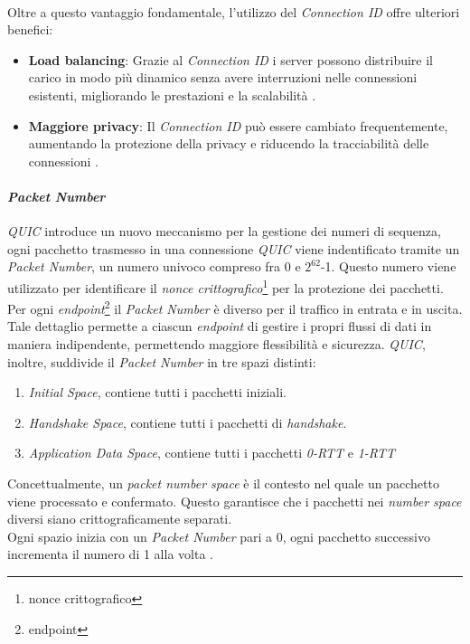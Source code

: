 \\
Oltre a questo vantaggio fondamentale, l'utilizzo del \emph{Connection ID} offre ulteriori benefici:
\begin{itemize}
\item \textbf{Load balancing}: Grazie al \emph{Connection ID} i server possono distribuire il carico in modo più dinamico senza avere interruzioni nelle connessioni esistenti, migliorando le prestazioni e la scalabilità \cite{site:quic-lb}.
\item \textbf{Maggiore privacy}: Il \emph{Connection ID} può essere cambiato frequentemente, aumentando la protezione della privacy e riducendo la tracciabilità delle connessioni \cite{site:quic-security}.
\end{itemize}
\paragraph{\textit{Packet Number}}

\noindent \emph{QUIC} introduce un nuovo meccanismo per la gestione dei numeri di sequenza, ogni pacchetto trasmesso in una connessione \emph{QUIC} viene indentificato tramite un \emph{Packet Number}, un numero univoco 
compreso fra 0 e $2^{62}$-1. Questo numero viene utilizzato per identificare il \emph{nonce crittografico}\footnote{\gls{nonce crittografico}} per la protezione dei pacchetti. 
Per ogni \emph{endpoint}\footnote{\gls{endpoint}} il \emph{Packet Number} è diverso per il traffico in entrata e in uscita. 
Tale dettaglio permette a ciascun \emph{endpoint} di gestire i propri flussi di dati in maniera indipendente, permettendo maggiore flessibilità e sicurezza.
\emph{QUIC}, inoltre, suddivide il \emph{Packet Number} in tre spazi distinti:
\begin{enumerate}[label=\roman*]
    \item \emph{Initial Space}, contiene tutti i pacchetti iniziali.
    \item \emph{Handshake Space}, contiene tutti i pacchetti di \emph{handshake}.
    \item \emph{Application Data Space}, contiene tutti i pacchetti \emph{0-RTT} e \emph{1-RTT}
\end{enumerate}
\noindent Concettualmente, un \emph{packet number space} è il contesto nel quale un pacchetto viene processato e confermato. Questo garantisce che i pacchetti nei \emph{number space} diversi siano crittograficamente separati.
\\
Ogni spazio inizia con un \emph{Packet Number} pari a 0, ogni pacchetto successivo incrementa il numero di 1 alla volta \cite{site:rfc9000}. 


